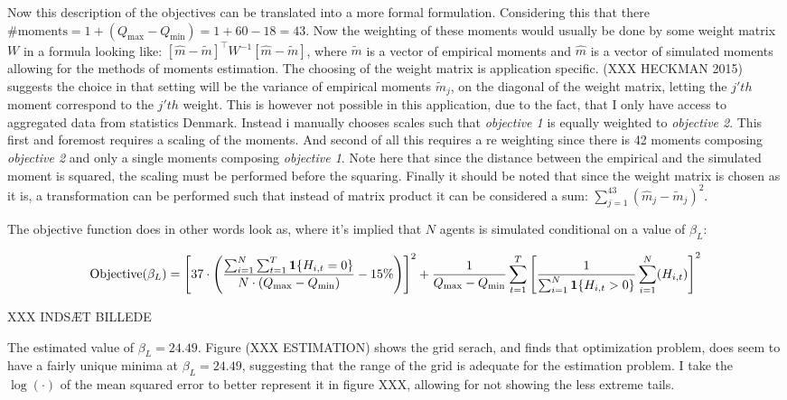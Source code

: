 Now this description of the objectives can be translated into a more formal formulation. Considering this that there $\text{\# moments}  = 1 + (Q_{\max} - Q_{\min}) = 1 + 60 - 18 = 43$. Now the weighting of these moments would usually be done by some weight matrix $W$ in a formula looking like: $[\hat{m} - \tilde{m}]^{\top} W^{-1} [\hat{m} - \tilde{m}]$, where $\tilde{m}$ is a vector of empirical moments and $\hat{m}$ is a vector of simulated moments allowing for the methods of moments estimation. The choosing of the weight matrix is application specific. (XXX HECKMAN 2015) suggests the choice in that setting will be the variance of empirical moments $\tilde{m}_j$, on the diagonal of the weight matrix, letting the $j'th$ moment correspond to the $j'th$ weight. This is however not possible in this application, due to the fact, that I only have access to aggregated data from statistics Denmark. Instead i manually chooses scales such that \textit{objective 1} is equally weighted to \textit{objective 2}. This first and foremost requires a scaling of the moments. And second of all this requires a re weighting since there is 42 moments composing \textit{objective 2} and only a single moments composing \textit{objective 1}. Note here that since the distance between the empirical and the simulated moment is squared, the scaling must be performed before the squaring. Finally it should be noted that since the weight matrix is chosen as it is, a transformation can be performed such that instead of matrix product it can be considered a sum: $\sum_{j = 1}
^{43} ( \hat{m}_j - \tilde{m}_j )^2$.

The objective function does in other words look as, where it's implied that $N$ agents is simulated conditional on a value of $\beta_L$:

\begin{equation}
   \text{Objective}(\beta_L) =  \left[ 37 \cdot \left(\frac{\sum_{i=1}^{N} \sum_{t=1}^T \mathbf{1}\{H_{i,t} = 0\}}{ N \cdot (Q_{\max} - Q_{\min} )} - 15\% \right) \right]^2 + \frac{1}{Q_{\max} - Q_{\min}}\sum_{t=1}^{T} \left[ \frac{1}{\sum_{i=1}^{N} \mathbf{1}\{H_{i,t} > 0\}}\sum_{i=1}^N (H_{i,t})\right]^2
\end{equation}

XXX INDSÆT BILLEDE

The estimated value of $\beta_L = 24.49$. Figure (XXX ESTIMATION) shows the grid serach, and finds that optimization problem, does seem to have a fairly unique minima at $\beta_L = 24.49$, suggesting that the range of the grid is adequate for the estimation problem. I take the $\log (\cdot)$ of the mean squared error to better represent it in figure XXX, allowing for not showing the less extreme tails.